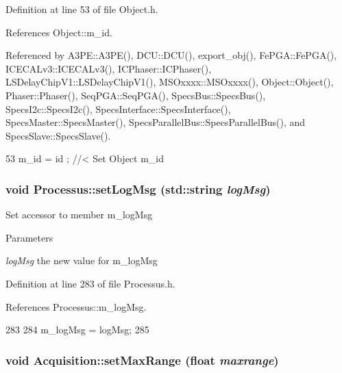 Definition at line 53 of file Object.h.

References Object::m\_\-id.

Referenced by A3PE::A3PE(), DCU::DCU(), export\_\-obj(), FePGA::FePGA(), ICECALv3::ICECALv3(), ICPhaser::ICPhaser(), LSDelayChipV1::LSDelayChipV1(), MSOxxxx::MSOxxxx(), Object::Object(), Phaser::Phaser(), SeqPGA::SeqPGA(), SpecsBus::SpecsBus(), SpecsI2c::SpecsI2c(), SpecsInterface::SpecsInterface(), SpecsMaster::SpecsMaster(), SpecsParallelBus::SpecsParallelBus(), and SpecsSlave::SpecsSlave().


\begin{DoxyCode}
53 { m_id    = id    ; } //< Set Object m_id
\end{DoxyCode}
\hypertarget{classProcessus_a471833f89047aa9a7ff6200a31c17a1d}{
\subsubsection[{setLogMsg}]{\setlength{\rightskip}{0pt plus 5cm}void Processus::setLogMsg (std::string {\em logMsg})}}
\label{classProcessus_a471833f89047aa9a7ff6200a31c17a1d}
Set accessor to member m\_\-logMsg 
\begin{DoxyParams}{Parameters}
\item[{\em logMsg}]the new value for m\_\-logMsg \end{DoxyParams}


Definition at line 283 of file Processus.h.

References Processus::m\_\-logMsg.


\begin{DoxyCode}
283                                     {
284     m_logMsg = logMsg;
285   }
\end{DoxyCode}
\hypertarget{classAcquisition_a786da6cff5428020034be23e554e0e1b}{
\subsubsection[{setMaxRange}]{\setlength{\rightskip}{0pt plus 5cm}void Acquisition::setMaxRange (float {\em maxrange})}}
\label{classAcquisition_a786da6cff5428020034be23e554e0e1b}



